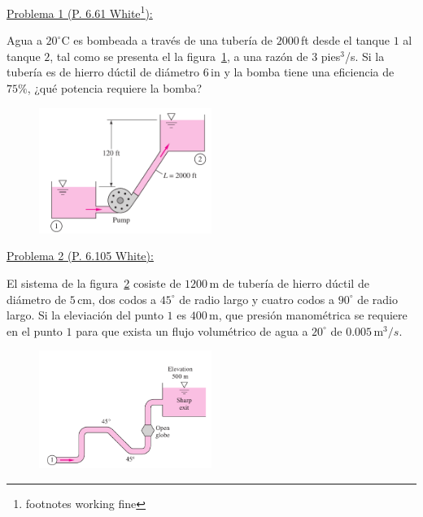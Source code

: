 \documentclass[11pt]{report}
\begin{document}

\vspace{1cm}


\vspace{1cm}

\underline {Problema 1 (P. 6.61 White\footnote{footnotes working fine}):}
\vspace{0.2cm}

Agua a $20^\circ$C es bombeada a trav\'es de una tuber\'ia de $2000$\,ft desde el tanque $1$ al tanque $2$, tal como se presenta el la figura~\ref{fig:fig1}, a una raz\'on de $3$ pies$^3$/s. Si la tuber\'ia es de hierro d\'uctil de di\'ametro $6$\,in y la bomba tiene una eficiencia de $75\%$, ¿qué potencia requiere la bomba?

\begin{figure}[H]
\centering\includegraphics[width=0.5\textwidth]{Figures/p1.png}
\caption{\label{fig:fig1} }
\end{figure}

\newpage

\underline {Problema 2 (P. 6.105 White):}
\vspace{0.2cm}

El sistema de la figura~\ref{fig:fig3} cosiste de $1200$\,m de tuber\'ia de hierro d\'uctil de di\'ametro de $5$\,cm, dos codos a $45^\circ$ de radio largo y cuatro codos a $90^\circ$ de radio largo. Si la eleviaci\'on del punto $1$ es $400$\,m, que presi\'on manom\'etrica se requiere en el punto $1$ para que exista un flujo volum\'etrico de agua a $20^\circ$ de $0.005$\,m$^3/s$.

\begin{figure}[H]
\centering\includegraphics[width=0.5\textwidth]{Figures/p3.png}
\caption{\label{fig:fig3} }
\end{figure}
\end{document}
